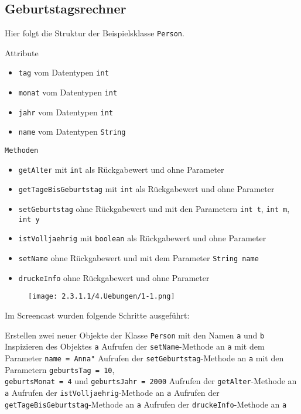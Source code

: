 \documentclass[]{scrartcl}   %
\begin{document}
\subsection{Geburtstagsrechner}

Hier folgt die Struktur der Beispielsklasse \texttt{Person}.

\begin{itemize}
    \barrow Attribute
    \begin{itemize}
    \item \texttt{tag} vom Datentypen \texttt{int}
    \item \texttt{monat} vom Datentypen \texttt{int}
    \item \texttt{jahr} vom Datentypen \texttt{int}
    \item \texttt{name} vom Datentypen \texttt{String}
    \end{itemize}
    \barrow \texttt{Methoden}
    \begin{itemize}
    \item \texttt{getAlter} mit \texttt{int} als Rückgabewert und ohne Parameter
    \item \texttt{getTageBisGeburtstag} mit \texttt{int} als Rückgabewert und ohne Parameter
    \item \texttt{setGeburtstag} ohne Rückgabewert und mit den Parametern \texttt{int t}, \texttt{int m}, \texttt{int y}
    \item \texttt{istVolljaehrig} mit \texttt{boolean} als Rückgabewert und ohne Parameter
    \item \texttt{setName} ohne Rückgabewert und mit dem Parameter \texttt{String name}
    \item \texttt{druckeInfo} ohne Rückgabewert und ohne Parameter
    \end{itemize}
\end{itemize}

\vspace{0.5cm}

\begin{figure}[ht]
	\centering
	\texttt{[image: 2.3.1.1/4.Uebungen/1-1.png]}
\end{figure}

\newpage

Im Screencast wurden folgende Schritte ausgeführt:

\begin{itemize}
    \barrow Erstellen zwei neuer Objekte der Klasse \texttt{Person} mit den Namen \texttt{a} und \texttt{b}
    \barrow Inspizieren des Objektes \texttt{a}
    \barrow Aufrufen der \texttt{setName}-Methode an \texttt{a} mit dem Parameter \texttt{name = \dq Anna"}
    \barrow Aufrufen der \texttt{setGeburtstag}-Methode an \texttt{a} mit den Parametern \texttt{geburtsTag = 10},\\ \texttt{geburtsMonat = 4} und \texttt{geburtsJahr = 2000}
    \barrow Aufrufen der \texttt{getAlter}-Methode an \texttt{a}
    \barrow Aufrufen der \texttt{istVolljaehrig}-Methode an \texttt{a}
    \barrow Aufrufen der \texttt{getTageBisGeburtstag}-Methode an \texttt{a}
    \barrow Aufrufen der \texttt{druckeInfo}-Methode an \texttt{a}
\end{itemize}
\end{document}
